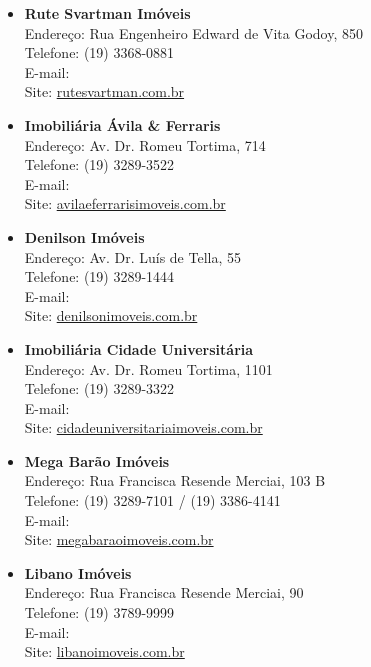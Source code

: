 \begin{itemize}
    \item   \textbf{Rute Svartman Imóveis}
        \\Endereço: Rua Engenheiro Edward de Vita Godoy, 850
        \\Telefone: (19) 3368-0881
        \\E-mail: 
        \\Site: \url{rutesvartman.com.br}

    \item   \textbf{Imobiliária Ávila \& Ferraris}
        \\Endereço: Av. Dr. Romeu Tortima, 714
        \\Telefone: (19) 3289-3522
        \\E-mail: 
        \\Site: \url{avilaeferrarisimoveis.com.br}

    \item   \textbf{Denilson Imóveis}
        \\Endereço: Av. Dr. Luís de Tella, 55
        \\Telefone: (19) 3289-1444
        \\E-mail: 
        \\Site: \url{denilsonimoveis.com.br}

    \item   \textbf{Imobiliária Cidade Universitária}
        \\Endereço: Av. Dr. Romeu Tortima, 1101
        \\Telefone: (19) 3289-3322
        \\E-mail: 
        \\Site: \url{cidadeuniversitariaimoveis.com.br}

    \item   \textbf{Mega Barão Imóveis}
        \\Endereço: Rua Francisca Resende Merciai, 103 B
        \\Telefone: (19) 3289-7101 / (19) 3386-4141
        \\E-mail: 
        \\Site: \url{megabaraoimoveis.com.br}

    \item   \textbf{Libano Imóveis}
        \\Endereço: Rua Francisca Resende Merciai, 90
        \\Telefone: (19) 3789-9999
        \\E-mail: 
        \\Site: \url{libanoimoveis.com.br}


\end{itemize}
